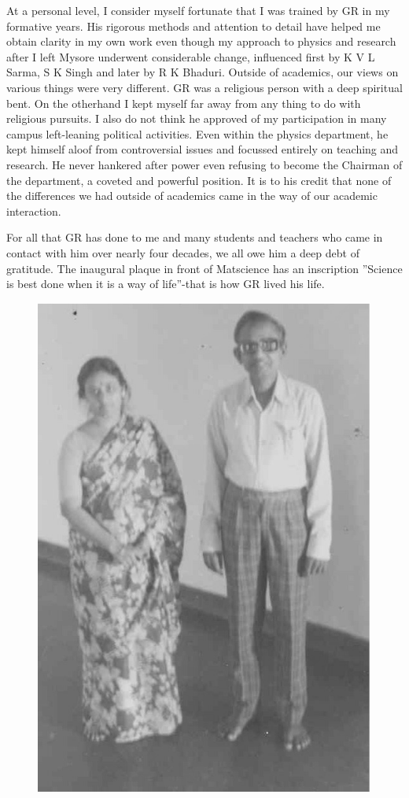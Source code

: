 At a personal level, I consider myself fortunate that I was trained by GR in my formative years. His rigorous methods and attention to detail have helped me obtain clarity in my own work even though my approach to physics and research after I left Mysore underwent considerable change, influenced first by K V L Sarma, S K Singh and later by R K Bhaduri. Outside of academics, our views on various things were very different. GR was a religious person with a deep spiritual bent. On the otherhand I kept myself far away from any thing to do with religious pursuits. I also do not think he approved of my participation in many campus left-leaning political activities. Even within the physics department, he kept himself aloof from controversial issues and focussed entirely on teaching and research. He never hankered after power even refusing to become the Chairman of the department, a coveted and powerful position. It is to his credit that none of the differences we had outside of academics came in the way of our academic interaction.

For all that GR has done to me and many students and teachers who came in contact with him over nearly four decades, we all owe him a deep debt of gratitude. The inaugural plaque in front of Matscience has an inscription ”Science is best done when it is a way of life”-that is how GR lived his life.

\begin{figure}[H]
\centering
\includegraphics[scale=1.5]{src/images/chap14/003.eps}
\end{figure}


